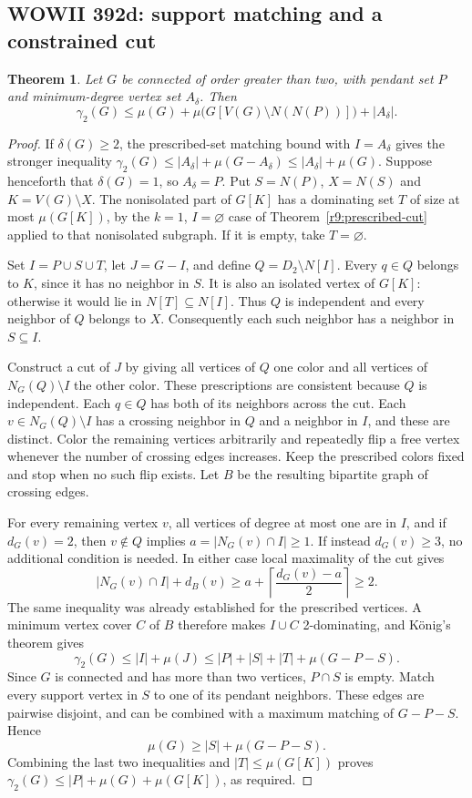 \documentclass[11pt,a4paper]{article}
\newtheorem{theorem}{Theorem}[section]
\theoremstyle{remark}
\begin{document}
\subsection{WOWII 392d: support matching and a constrained cut}
\label{r9:392d}
\begin{theorem}\label{r9:thm392d}
Let $G$ be connected of order greater than two, with pendant set $P$ and
minimum-degree vertex set $A_\delta$. Then
\[
 \gamma_2(G)\le \mu(G)+\mu\bigl(G[V(G)\setminus N(N(P))]\bigr)
                      +|A_\delta|.
\]
\end{theorem}
\begin{proof}
If $\delta(G)\ge2$, the prescribed-set matching bound with
$I=A_\delta$ gives the stronger inequality
$\gamma_2(G)\le |A_\delta|+\mu(G-A_\delta)\le |A_\delta|+\mu(G)$.
Suppose henceforth that $\delta(G)=1$, so $A_\delta=P$.
Put $S=N(P)$, $X=N(S)$ and $K=V(G)\setminus X$.
The nonisolated part of $G[K]$ has a dominating set $T$ of size at most
$\mu(G[K])$, by the $k=1$, $I=\varnothing$ case of
Theorem~\ref{r9:prescribed-cut} applied to that nonisolated subgraph.
If it is empty, take $T=\varnothing$.

Set $I=P\cup S\cup T$, let $J=G-I$, and define
$Q=D_2\setminus N[I]$. Every $q\in Q$ belongs to $K$, since it has no
neighbor in $S$. It is also an isolated vertex of $G[K]$: otherwise it
would lie in $N[T]\subseteq N[I]$. Thus $Q$ is independent and every
neighbor of $Q$ belongs to $X$. Consequently each such neighbor has a
neighbor in $S\subseteq I$.

Construct a cut of $J$ by giving all vertices of $Q$ one color and all
vertices of $N_G(Q)\setminus I$ the other color. These prescriptions
are consistent because $Q$ is independent. Each $q\in Q$ has both of
its neighbors across the cut. Each $v\in N_G(Q)\setminus I$ has a
crossing neighbor in $Q$ and a neighbor in $I$, and these are distinct.
Color the remaining vertices arbitrarily and repeatedly flip a free
vertex whenever the number of crossing edges increases. Keep the
prescribed colors fixed and stop when no such flip exists. Let $B$ be the resulting bipartite
graph of crossing edges.

For every remaining vertex $v$, all vertices of degree at most one are
in $I$, and if $d_G(v)=2$, then $v\notin Q$ implies
$a=|N_G(v)\cap I|\ge1$. If instead $d_G(v)\ge3$, no additional
condition is needed. In either case local maximality of the cut gives
\[
 |N_G(v)\cap I|+d_B(v)
 \ge a+\left\lceil\frac{d_G(v)-a}{2}\right\rceil\ge2.
\]
The same inequality was already established for the prescribed vertices.
A minimum vertex cover $C$ of $B$ therefore makes $I\cup C$
2-dominating, and K\"onig's theorem gives
\[
 \gamma_2(G)\le |I|+\mu(J)
 \le |P|+|S|+|T|+\mu(G-P-S).
\]
Since $G$ is connected and has more than two vertices, $P\cap S$ is
empty. Match every support vertex in $S$ to one of its pendant neighbors.
These edges are pairwise disjoint, and can be combined with a maximum
matching of $G-P-S$. Hence
\[
 \mu(G)\ge |S|+\mu(G-P-S).
\]
Combining the last two inequalities and $|T|\le\mu(G[K])$ proves
$\gamma_2(G)\le |P|+\mu(G)+\mu(G[K])$, as required.
\end{proof}
\end{document}
